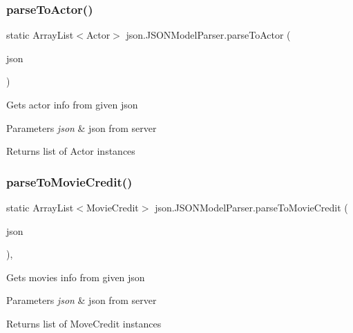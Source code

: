 \subsubsection{\texorpdfstring{parse\+To\+Actor()}{parseToActor()}}
{\footnotesize\ttfamily static Array\+List$<$Actor$>$ json.\+J\+S\+O\+N\+Model\+Parser.\+parse\+To\+Actor (\begin{DoxyParamCaption}\item[{J\+S\+O\+N\+Array}]{json }\end{DoxyParamCaption})\hspace{0.3cm}{\ttfamily [static]}}

Gets actor info from given json 
\begin{DoxyParams}{Parameters}
{\em json} & json from server \\
\hline
\end{DoxyParams}
\begin{DoxyReturn}{Returns}
list of Actor instances 
\end{DoxyReturn}
\mbox{\label{classjson_1_1_j_s_o_n_model_parser_a589014a21bef29a519bbce9f6b92616a}} 
\subsubsection{\texorpdfstring{parse\+To\+Movie\+Credit()}{parseToMovieCredit()}}
{\footnotesize\ttfamily static Array\+List$<$Movie\+Credit$>$ json.\+J\+S\+O\+N\+Model\+Parser.\+parse\+To\+Movie\+Credit (\begin{DoxyParamCaption}\item[{J\+S\+O\+N\+Array}]{json }\end{DoxyParamCaption})\hspace{0.3cm}{\ttfamily [static]}, {\ttfamily [private]}}

Gets movies info from given json 
\begin{DoxyParams}{Parameters}
{\em json} & json from server \\
\hline
\end{DoxyParams}
\begin{DoxyReturn}{Returns}
list of Move\+Credit instances 
\end{DoxyReturn}
\mbox{\label{classjson_1_1_j_s_o_n_model_parser_aac2531ca949c5c0e9d098b271745a7b3}} 
